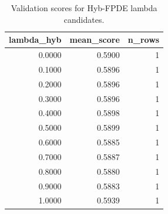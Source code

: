 \begin{table}[t]
\caption{Validation scores for Hyb-FPDE lambda candidates.}
\label{tab:lambda_distribution_computed}
\centering
\begin{tabular}{rrr}
\toprule
lambda\_hyb & mean\_score & n\_rows \\
\midrule
0.0000 & 0.5900 & 1 \\
0.1000 & 0.5896 & 1 \\
0.2000 & 0.5896 & 1 \\
0.3000 & 0.5896 & 1 \\
0.4000 & 0.5898 & 1 \\
0.5000 & 0.5899 & 1 \\
0.6000 & 0.5885 & 1 \\
0.7000 & 0.5887 & 1 \\
0.8000 & 0.5880 & 1 \\
0.9000 & 0.5883 & 1 \\
1.0000 & 0.5939 & 1 \\
\bottomrule
\end{tabular}

\end{table}
